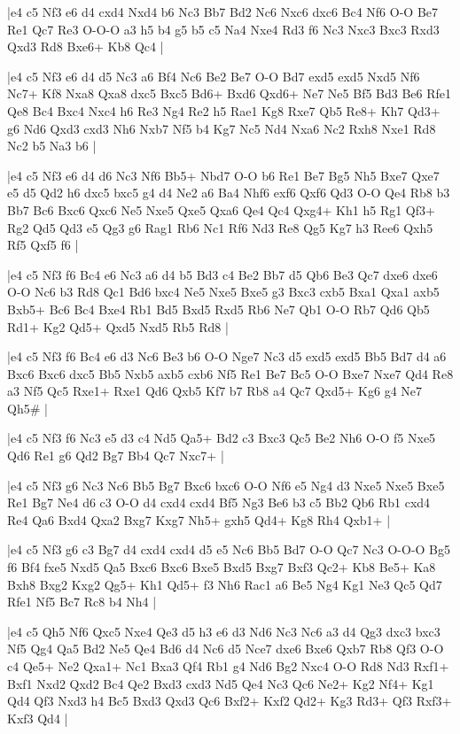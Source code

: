 \whitename{}
\blackname{}
\makegametitle
|e4 c5 Nf3 e6 d4 cxd4 Nxd4 b6 Nc3 Bb7 Bd2 Nc6 Nxc6 dxc6 Bc4 Nf6 O-O Be7 Re1 Qc7 Re3 O-O-O a3 h5 b4 g5 b5 c5 Na4 Nxe4 Rd3 f6 Nc3 Nxc3 Bxc3 Rxd3 Qxd3 Rd8 Bxe6+ Kb8 Qc4  |

\whitename{}
\blackname{}
\makegametitle
|e4 c5 Nf3 e6 d4 d5 Nc3 a6 Bf4 Nc6 Be2 Be7 O-O Bd7 exd5 exd5 Nxd5 Nf6 Nc7+ Kf8 Nxa8 Qxa8 dxc5 Bxc5 Bd6+ Bxd6 Qxd6+ Ne7 Ne5 Bf5 Bd3 Be6 Rfe1 Qe8 Bc4 Bxc4 Nxc4 h6 Re3 Ng4 Re2 h5 Rae1 Kg8 Rxe7 Qb5 Re8+ Kh7 Qd3+ g6 Nd6 Qxd3 cxd3 Nh6 Nxb7 Nf5 b4 Kg7 Nc5 Nd4 Nxa6 Nc2 Rxh8 Nxe1 Rd8 Nc2 b5 Na3 b6  |

\whitename{}
\blackname{}
\makegametitle
|e4 c5 Nf3 e6 d4 d6 Nc3 Nf6 Bb5+ Nbd7 O-O b6 Re1 Be7 Bg5 Nh5 Bxe7 Qxe7 e5 d5 Qd2 h6 dxc5 bxc5 g4 d4 Ne2 a6 Ba4 Nhf6 exf6 Qxf6 Qd3 O-O Qe4 Rb8 b3 Bb7 Bc6 Bxc6 Qxc6 Ne5 Nxe5 Qxe5 Qxa6 Qe4 Qc4 Qxg4+ Kh1 h5 Rg1 Qf3+ Rg2 Qd5 Qd3 e5 Qg3 g6 Rag1 Rb6 Nc1 Rf6 Nd3 Re8 Qg5 Kg7 h3 Ree6 Qxh5 Rf5 Qxf5 f6  |

\whitename{}
\blackname{}
\makegametitle
|e4 c5 Nf3 f6 Bc4 e6 Nc3 a6 d4 b5 Bd3 c4 Be2 Bb7 d5 Qb6 Be3 Qc7 dxe6 dxe6 O-O Nc6 b3 Rd8 Qc1 Bd6 bxc4 Ne5 Nxe5 Bxe5 g3 Bxc3 cxb5 Bxa1 Qxa1 axb5 Bxb5+ Bc6 Bc4 Bxe4 Rb1 Bd5 Bxd5 Rxd5 Rb6 Ne7 Qb1 O-O Rb7 Qd6 Qb5 Rd1+ Kg2 Qd5+ Qxd5 Nxd5 Rb5 Rd8  |

\whitename{}
\blackname{}
\makegametitle
|e4 c5 Nf3 f6 Bc4 e6 d3 Nc6 Be3 b6 O-O Nge7 Nc3 d5 exd5 exd5 Bb5 Bd7 d4 a6 Bxc6 Bxc6 dxc5 Bb5 Nxb5 axb5 cxb6 Nf5 Re1 Be7 Bc5 O-O Bxe7 Nxe7 Qd4 Re8 a3 Nf5 Qc5 Rxe1+ Rxe1 Qd6 Qxb5 Kf7 b7 Rb8 a4 Qc7 Qxd5+ Kg6 g4 Ne7 Qh5\#  |

\whitename{}
\blackname{}
\makegametitle
|e4 c5 Nf3 f6 Nc3 e5 d3 c4 Nd5 Qa5+ Bd2 c3 Bxc3 Qc5 Be2 Nh6 O-O f5 Nxe5 Qd6 Re1 g6 Qd2 Bg7 Bb4 Qc7 Nxc7+  |

\whitename{}
\blackname{}
\makegametitle
|e4 c5 Nf3 g6 Nc3 Nc6 Bb5 Bg7 Bxc6 bxc6 O-O Nf6 e5 Ng4 d3 Nxe5 Nxe5 Bxe5 Re1 Bg7 Ne4 d6 c3 O-O d4 cxd4 cxd4 Bf5 Ng3 Be6 b3 c5 Bb2 Qb6 Rb1 cxd4 Re4 Qa6 Bxd4 Qxa2 Bxg7 Kxg7 Nh5+ gxh5 Qd4+ Kg8 Rh4 Qxb1+  |

\whitename{}
\blackname{}
\makegametitle
|e4 c5 Nf3 g6 c3 Bg7 d4 cxd4 cxd4 d5 e5 Nc6 Bb5 Bd7 O-O Qc7 Nc3 O-O-O Bg5 f6 Bf4 fxe5 Nxd5 Qa5 Bxc6 Bxc6 Bxe5 Bxd5 Bxg7 Bxf3 Qc2+ Kb8 Be5+ Ka8 Bxh8 Bxg2 Kxg2 Qg5+ Kh1 Qd5+ f3 Nh6 Rac1 a6 Be5 Ng4 Kg1 Ne3 Qc5 Qd7 Rfe1 Nf5 Bc7 Rc8 b4 Nh4  |

\whitename{}
\blackname{}
\makegametitle
|e4 c5 Qh5 Nf6 Qxc5 Nxe4 Qe3 d5 h3 e6 d3 Nd6 Nc3 Nc6 a3 d4 Qg3 dxc3 bxc3 Nf5 Qg4 Qa5 Bd2 Ne5 Qe4 Bd6 d4 Nc6 d5 Nce7 dxe6 Bxe6 Qxb7 Rb8 Qf3 O-O c4 Qe5+ Ne2 Qxa1+ Nc1 Bxa3 Qf4 Rb1 g4 Nd6 Bg2 Nxc4 O-O Rd8 Nd3 Rxf1+ Bxf1 Nxd2 Qxd2 Bc4 Qe2 Bxd3 cxd3 Nd5 Qe4 Nc3 Qc6 Ne2+ Kg2 Nf4+ Kg1 Qd4 Qf3 Nxd3 h4 Bc5 Bxd3 Qxd3 Qc6 Bxf2+ Kxf2 Qd2+ Kg3 Rd3+ Qf3 Rxf3+ Kxf3 Qd4  |

